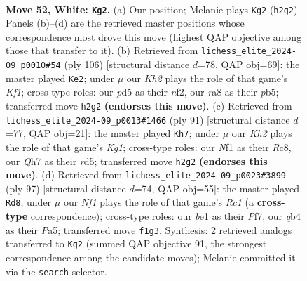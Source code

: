 \documentclass[11pt]{article}
\begin{document}
\clearpage

\begin{figure}[p]\centering
\begin{subfigure}{0.46\textwidth}\centering
\resizebox{\linewidth}{!}{%
\newchessgame
\chessboard[
  setfen={r5r1/p1k3pQ/7p/3p3P/pq1P2P1/4P3/7K/4bN2 w - - 12 52},
  showmover=false,
  pgfstyle=straightmove, color=movearrow, markmove={h2-g2}
]}
\caption{}
\end{subfigure}\hfill
\begin{subfigure}{0.46\textwidth}\centering
\resizebox{\linewidth}{!}{%
\newchessgame
\chessboard[
  setfen={8/2p2rk1/1b1pQ3/1p2p3/4P3/2P5/PP3n2/5K2 w - - 2 54},
  showmover=false,
  pgfstyle=straightmove, color=movearrow, markmove={f1-e2}
]}
\caption{}
\end{subfigure}
\\[4pt]
\begin{subfigure}{0.46\textwidth}\centering
\resizebox{\linewidth}{!}{%
\newchessgame
\chessboard[
  setfen={2r3k1/6p1/q2P1p1p/3Rb3/PB2P1PP/1Q6/K7/8 b - - 0 46},
  showmover=false,
  pgfstyle=straightmove, color=movearrow, markmove={g8-h7}
]}
\caption{}
\end{subfigure}\hfill
\begin{subfigure}{0.46\textwidth}\centering
\resizebox{\linewidth}{!}{%
\newchessgame
\chessboard[
  setfen={2r3k1/1p3p2/1P1p2p1/p2P3p/P1P5/2Q1R2P/5qPK/8 b - - 7 49},
  showmover=false,
  pgfstyle=straightmove, color=movearrow, markmove={c8-d8}
]}
\caption{}
\end{subfigure}
\caption{\textbf{Move 52, White: \texttt{Kg2}.} (a) Our position; Melanie plays \texttt{Kg2} (\texttt{h2g2}). Panels (b)--(d) are the retrieved master positions whose correspondence most drove this move (highest QAP objective among those that transfer to it). (b) Retrieved from \texttt{lichess\_elite\_2024-09\_p0010\#54} (ply 106) [structural distance $d$=78, QAP obj=69]: the master played \texttt{Ke2}; under $\mu$ our \emph{Kh2} plays the role of that game's \emph{Kf1}; cross-type roles: our \emph{p}d5 as their \emph{n}f2, our \emph{r}a8 as their \emph{p}b5; transferred move \texttt{h2g2} \textbf{(endorses this move)}. (c) Retrieved from \texttt{lichess\_elite\_2024-09\_p0013\#1466} (ply 91) [structural distance $d$=77, QAP obj=21]: the master played \texttt{Kh7}; under $\mu$ our \emph{Kh2} plays the role of that game's \emph{Kg1}; cross-type roles: our \emph{N}f1 as their \emph{R}c8, our \emph{Q}h7 as their \emph{r}d5; transferred move \texttt{h2g2} \textbf{(endorses this move)}. (d) Retrieved from \texttt{lichess\_elite\_2024-09\_p0023\#3899} (ply 97) [structural distance $d$=74, QAP obj=55]: the master played \texttt{Rd8}; under $\mu$ our \emph{Nf1} plays the role of that game's \emph{Rc1} (a \textbf{cross-type} correspondence); cross-type roles: our \emph{b}e1 as their \emph{P}f7, our \emph{q}b4 as their \emph{P}a5; transferred move \texttt{f1g3}. Synthesis: 2 retrieved analogs transferred to \texttt{Kg2} (summed QAP objective 91, the strongest correspondence among the candidate moves); Melanie committed it via the \texttt{search} selector.}
\label{fig:thought-m102}
\end{figure}
\end{document}

